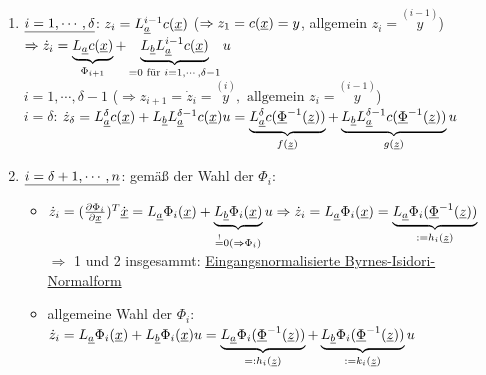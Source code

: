 \documentclass[openany,a4paper,11pt]{book}
\begin{document}
\begin{enumerate}
    \item $\uline{i=1,\cdots,\delta}$: $z_i=L_{\uline{a}}^{i-1}c(\uline{x})$ ($\Rightarrow z_1=c(\uline{x})=y$, allgemein $z_i=\stackrel{(i-1)}{y}$)\\
    $\Rightarrow \dot{z}_i=\underbrace{L_{\uline{a}}c(\uline{x})}_{\Phi_{i+1}}+\underbrace{L_{\uline{b}}L_{\uline{a}}^{i-1}c(\uline{x})}_{=0 \text{ für } i=1,\cdots, \delta-1}u$\\
      \quad \quad $i=1,\cdots,\delta-1$ \quad ($\Rightarrow z_{i+1}=\dot{z}_i=\stackrel{(i)}{y}, \text{ allgemein } z_i=\stackrel{(i-1)}{y}$)\\
    $i=\delta$: $\dot{z}_{\delta}=L_{\uline{a}}^{\delta}c(\uline{x})+L_{\uline{b}}L_{\uline{a}}^{\delta-1}c(\uline{x})u=\underbrace{L_{\uline{a}}^{\delta}c(\uline{\Phi}^{-1}(\uline{z}))}_{f(\uline{z})}+\underbrace{L_{\uline{b}}L_{\uline{a}}^{\delta-1}c(\uline{\Phi}^{-1}(\uline{z}))}_{g(\uline{z})}u$
    \item $\uline{i=\delta+1,\cdots,n}$: gemäß der Wahl der $\Phi_i$:\begin{itemize}
        \item $\dot{z}_i=(\frac{\partial \Phi_i}{\partial \uline{x}})^T\dot{\uline{x}}=L_{\uline{a}}\Phi_i(\uline{x})+\underbrace{L_{\uline{b}}\Phi_i(\uline{x})}_{\stackrel{!}{=}0 (\Rightarrow \Phi_i)}u\Rightarrow \dot{z}_i=L_{\uline{a}}\Phi_i(\uline{x})=\underbrace{L_{\uline{a}}\Phi_i(\uline{\Phi}^{-1}(\uline{z}))}_{:=h_i(\uline{z})}$\\
        $\Rightarrow$ 1 und 2 insgesammt: \uline{Eingangsnormalisierte Byrnes-Isidori-Normalform} \\
        \begin{minipage}[c]{\textwidth}
        \end{minipage}
        \item allgemeine Wahl der $\Phi_i$:\\ $\dot{z}_i=L_{\uline{a}}\Phi_i(\uline{x})+L_{\uline{b}}\Phi_i(\uline{x})u=\underbrace{L_{\uline{a}}\Phi_i(\uline{\Phi}^{-1}(\uline{z}))}_{=:h_i(\uline{z})}+\underbrace{L_{\uline{b}}\Phi_i(\uline{\Phi}^{-1}(\uline{z}))}_{:=k_i(\uline{z})}u$\\

\end{itemize}
\end{enumerate}
\end{document}
